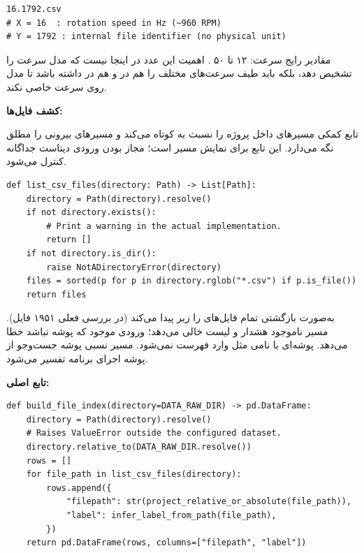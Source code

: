 \documentclass{article}
\newcommand{\mysubsection}[1]{
\par\vspace{0.5cm}
\noindent\textcolor{main_blue}{\large\textbf{#1}}
\par\vspace{0.2cm}
}
\begin{document}
\begin{latin}
\begin{lstlisting}
16.1792.csv
# X = 16  : rotation speed in Hz (~960 RPM)
# Y = 1792 : internal file identifier (no physical unit)
\end{lstlisting}
\end{latin}

مقادیر رایج سرعت: ۱۲ تا ۵۰ . اهمیت این عدد در اینجا نیست که مدل
سرعت را تشخیص دهد، بلکه  باید طیف سرعت‌های مختلف را هم در 
و هم در  داشته باشد تا مدل روی سرعت خاصی  نکند.

\mysubsection{کشف فایل‌ها: }

تابع کمکی  مسیرهای داخل پروژه را نسبت به
 کوتاه می‌کند و مسیرهای بیرونی را مطلق نگه می‌دارد.
این تابع برای نمایش مسیر است؛ مجاز بودن ورودی دیتاست جداگانه کنترل می‌شود.

\begin{latin}
\begin{lstlisting}
def list_csv_files(directory: Path) -> List[Path]:
    directory = Path(directory).resolve()
    if not directory.exists():
        # Print a warning in the actual implementation.
        return []
    if not directory.is_dir():
        raise NotADirectoryError(directory)
    files = sorted(p for p in directory.rglob("*.csv") if p.is_file())
    return files
\end{lstlisting}
\end{latin}

به‌صورت بازگشتی تمام فایل‌های  را زیر  پیدا می‌کند
(در بررسی فعلی ۱۹۵۱ فایل). مسیر ناموجود هشدار و لیست خالی می‌دهد؛ ورودی موجود
که پوشه نباشد خطا می‌دهد. پوشه‌ای با نامی مثل  وارد فهرست نمی‌شود.
مسیر نسبی پوشه جست‌وجو از پوشه اجرای برنامه تفسیر می‌شود.

\mysubsection{تابع اصلی: }

\begin{latin}
\begin{lstlisting}
def build_file_index(directory=DATA_RAW_DIR) -> pd.DataFrame:
    directory = Path(directory).resolve()
    # Raises ValueError outside the configured dataset.
    directory.relative_to(DATA_RAW_DIR.resolve())
    rows = []
    for file_path in list_csv_files(directory):
        rows.append({
            "filepath": str(project_relative_or_absolute(file_path)),
            "label": infer_label_from_path(file_path),
        })
    return pd.DataFrame(rows, columns=["filepath", "label"])
\end{lstlisting}
\end{latin}
\end{document}
